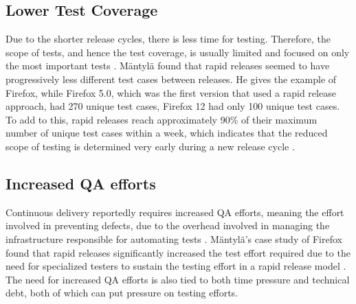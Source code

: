 \documentclass[10pt,journal,compsoc]{IEEEtran}
\begin{document}
\subsection{Lower Test Coverage}
Due to the shorter release cycles, there is less time for testing. Therefore, the scope of tests, and hence the test coverage, is usually limited and focused on only the most important tests \cite{mantyla2015rapid}. M{\"a}ntyl{\"a} found that rapid releases seemed to have progressively less different test cases between releases. He gives the example of Firefox, while Firefox 5.0, which was the first version that used a rapid release approach, had 270 unique test cases, Firefox 12 had only 100 unique test cases. To add to this, rapid releases reach approximately 90\% of their maximum number of unique test cases within a week, which indicates that the reduced scope of testing is determined very early during a new release cycle \cite{mantyla2015rapid}.

\subsection{Increased QA efforts}
Continuous delivery reportedly requires increased QA efforts, meaning the effort involved in preventing defects, due to the overhead involved in managing the infrastructure responsible for automating tests \cite{RODRIGUEZ2017263}. M{\"a}ntyl{\"a}'s case study of Firefox found that rapid releases significantly increased the test effort required due to the need for specialized testers to sustain the testing effort in a rapid release model \cite{mantyla2015rapid}. The need for increased QA efforts is also tied to both time pressure and technical debt, both of which can put pressure on testing efforts.

%
%
\end{document}
